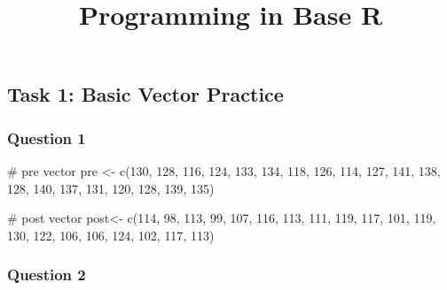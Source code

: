 \documentclass[
  letterpaper,
  DIV=11,
  numbers=noendperiod]{scrartcl}
\title{Programming in Base R}
\author{}
\date{}
\newenvironment{Shaded}{\begin{snugshade}}{\end{snugshade}}
\newcommand{\CommentTok}[1]{\textcolor[rgb]{0.37,0.37,0.37}{#1}}
\newcommand{\DecValTok}[1]{\textcolor[rgb]{0.68,0.00,0.00}{#1}}
\newcommand{\FunctionTok}[1]{\textcolor[rgb]{0.28,0.35,0.67}{#1}}
\newcommand{\NormalTok}[1]{\textcolor[rgb]{0.00,0.23,0.31}{#1}}
\newcommand{\OtherTok}[1]{\textcolor[rgb]{0.00,0.23,0.31}{#1}}
\begin{document}
\maketitle

\subsection{Task 1: Basic Vector
Practice}\label{task-1-basic-vector-practice}

\subsubsection{Question 1}\label{question-1}

\begin{Shaded}
\begin{Highlighting}[]
\CommentTok{\# pre vector }
\NormalTok{pre }\OtherTok{\textless{}{-}} \FunctionTok{c}\NormalTok{(}\DecValTok{130}\NormalTok{, }\DecValTok{128}\NormalTok{, }\DecValTok{116}\NormalTok{, }\DecValTok{124}\NormalTok{, }\DecValTok{133}\NormalTok{, }\DecValTok{134}\NormalTok{, }\DecValTok{118}\NormalTok{, }\DecValTok{126}\NormalTok{, }\DecValTok{114}\NormalTok{, }\DecValTok{127}\NormalTok{, }\DecValTok{141}\NormalTok{, }\DecValTok{138}\NormalTok{, }\DecValTok{128}\NormalTok{, }\DecValTok{140}\NormalTok{, }\DecValTok{137}\NormalTok{, }\DecValTok{131}\NormalTok{, }\DecValTok{120}\NormalTok{, }\DecValTok{128}\NormalTok{, }\DecValTok{139}\NormalTok{, }\DecValTok{135}\NormalTok{)}
  
  
\CommentTok{\# post vector}
\NormalTok{post}\OtherTok{\textless{}{-}} \FunctionTok{c}\NormalTok{(}\DecValTok{114}\NormalTok{, }\DecValTok{98}\NormalTok{, }\DecValTok{113}\NormalTok{, }\DecValTok{99}\NormalTok{, }\DecValTok{107}\NormalTok{, }\DecValTok{116}\NormalTok{, }\DecValTok{113}\NormalTok{, }\DecValTok{111}\NormalTok{, }\DecValTok{119}\NormalTok{, }\DecValTok{117}\NormalTok{, }\DecValTok{101}\NormalTok{, }\DecValTok{119}\NormalTok{, }\DecValTok{130}\NormalTok{, }\DecValTok{122}\NormalTok{, }\DecValTok{106}\NormalTok{, }\DecValTok{106}\NormalTok{, }\DecValTok{124}\NormalTok{, }\DecValTok{102}\NormalTok{, }\DecValTok{117}\NormalTok{, }\DecValTok{113}\NormalTok{)}
\end{Highlighting}
\end{Shaded}

\subsubsection{Question 2}\label{question-2}
\end{document}
